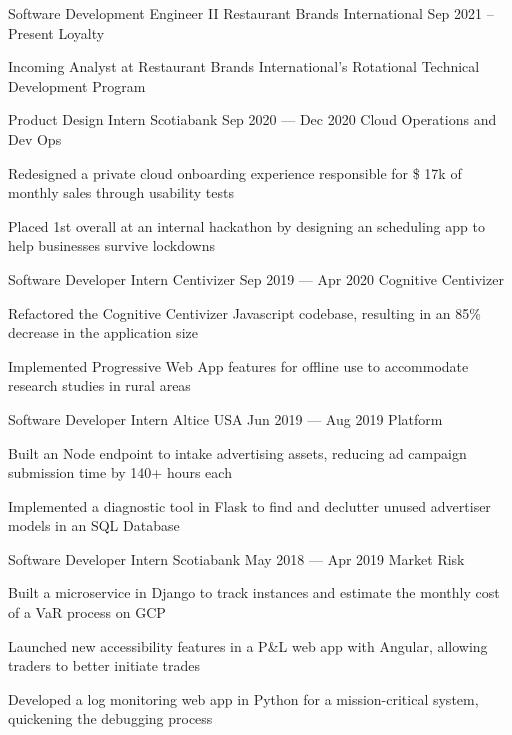 \begin{cventries}
  \cventry
      {Software Development Engineer II}
      {Restaurant Brands International}
      {}
      {Sep 2021 -- Present}
      {Loyalty}
      {
        \begin{cvitems}
          \item {Incoming Analyst at Restaurant Brands International's Rotational Technical Development Program}
        \end{cvitems}
      }
  \cventry
    {Product Design Intern}
    {Scotiabank}
    {}
    {Sep 2020 --- Dec 2020}
    {Cloud Operations and Dev Ops}
    {
      \begin{cvitems}
        \item {Redesigned a private cloud onboarding experience responsible for \$ 17k of monthly sales through usability tests}
        \item {Placed 1st overall at an internal hackathon by designing an scheduling app to help businesses survive lockdowns}
      \end{cvitems}
    }
  \cventry
    {Software Developer Intern}
    {Centivizer}
    {}
    {Sep 2019 --- Apr 2020}
    {Cognitive Centivizer}
    {
      \begin{cvitems}
        \item {Refactored the Cognitive Centivizer Javascript codebase, resulting in an 85\% decrease in the application size}
        \item {Implemented Progressive Web App features for offline use to accommodate research studies in rural areas}
      \end{cvitems}
    }

  \cventry
    {Software Developer Intern}
    {Altice USA}
    {}
    {Jun 2019 --- Aug 2019}
    {Platform}
    {
    \begin{cvitems}
      \item {Built an Node endpoint to intake advertising assets, reducing ad campaign submission time by 140+ hours each}
      \item {Implemented a diagnostic tool in Flask to find and declutter unused advertiser models in an SQL Database}
    \end{cvitems}
    }

  \cventry
    {Software Developer Intern}
    {Scotiabank}
    {}
    {May 2018 --- Apr 2019}
    {Market Risk}
    {
      \begin{cvitems}
        \item {Built a microservice in Django to track instances and estimate the monthly cost of a VaR process on GCP}
        \item {Launched new accessibility features in a P\&L web app with Angular, allowing traders to better initiate trades}
        \item {Developed a log monitoring web app in Python for a mission-critical system, quickening the debugging process}
      \end{cvitems}
    }
\end{cventries}
